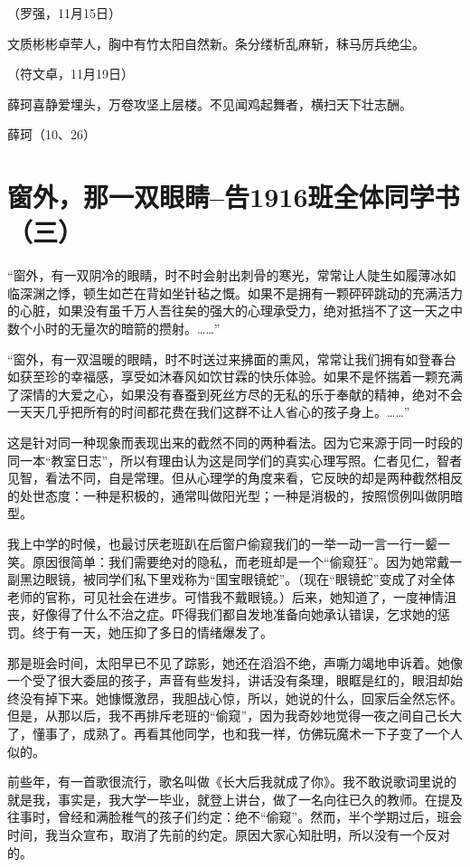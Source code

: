 \documentclass[openany]{ctexbook}
\begin{document}
（罗强，11月15日）

文质彬彬卓荦人，胸中有竹太阳自然新。条分缕析乱麻斩，秣马厉兵绝尘。

（符文卓，11月19日）

薛珂喜静爱埋头，万卷攻坚上层楼。不见闻鸡起舞者，横扫天下壮志酬。

薛珂（10、26）

\chapter*{窗外，那一双眼睛--告1916班全体同学书（三）}\label{letter3}

``窗外，有一双阴冷的眼睛，时不时会射出刺骨的寒光，常常让人陡生如履薄冰如临深渊之悸，顿生如芒在背如坐针毡之慨。如果不是拥有一颗砰砰跳动的充满活力的心脏，如果没有虽千万人吾往矣的强大的心理承受力，绝对抵挡不了这一天之中数个小时的无量次的暗箭的攒射。\ldots{}\ldots{}''

``窗外，有一双温暖的眼睛，时不时送过来拂面的熏风，常常让我们拥有如登春台如获至珍的幸福感，享受如沐春风如饮甘霖的快乐体验。如果不是怀揣着一颗充满了深情的大爱之心，如果没有春蚕到死丝方尽的无私的乐于奉献的精神，绝对不会一天天几乎把所有的时间都花费在我们这群不让人省心的孩子身上。\ldots{}\ldots{}''

这是针对同一种现象而表现出来的截然不同的两种看法。因为它来源于同一时段的同一本``教室日志''，所以有理由认为这是同学们的真实心理写照。仁者见仁，智者见智，看法不同，自是常理。但从心理学的角度来看，它反映的却是两种截然相反的处世态度：一种是积极的，通常叫做阳光型；一种是消极的，按照惯例叫做阴暗型。

我上中学的时候，也最讨厌老班趴在后窗户偷窥我们的一举一动一言一行一颦一笑。原因很简单：我们需要绝对的隐私，而老班却是一个``偷窥狂''。因为她常戴一副黑边眼镜，被同学们私下里戏称为``国宝眼镜蛇''。（现在``眼镜蛇''变成了对全体老师的官称，可见社会在进步。可惜我不戴眼镜。）后来，她知道了，一度神情沮丧，好像得了什么不治之症。吓得我们都自发地准备向她承认错误，乞求她的惩罚。终于有一天，她压抑了多日的情绪爆发了。

那是班会时间，太阳早已不见了踪影，她还在滔滔不绝，声嘶力竭地申诉着。她像一个受了很大委屈的孩子，声音有些发抖，讲话没有条理，眼眶是红的，眼泪却始终没有掉下来。她慷慨激昂，我胆战心惊，所以，她说的什么，回家后全然忘怀。但是，从那以后，我不再排斥老班的``偷窥''，因为我奇妙地觉得一夜之间自己长大了，懂事了，成熟了。再看其他同学，也和我一样，仿佛玩魔术一下子变了一个人似的。

前些年，有一首歌很流行，歌名叫做《长大后我就成了你》。我不敢说歌词里说的就是我，事实是，我大学一毕业，就登上讲台，做了一名向往已久的教师。在提及往事时，曾经和满脸稚气的孩子们约定：绝不``偷窥''。然而，半个学期过后，班会时间，我当众宣布，取消了先前的约定。原因大家心知肚明，所以没有一个反对的。
\end{document}
